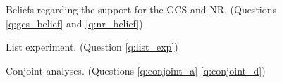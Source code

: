 \begin{figure}[h!]
    \caption{Beliefs regarding the support for the GCS and NR. (Questions \ref{q:gcs_belief} and \ref{q:nr_belief})}\label{fig:belief}
\end{figure}

\begin{figure}[h!]
    \caption{List experiment. (Question \ref{q:list_exp})}\label{fig:list_exp}
\end{figure}

\begin{figure}[h!]
    \caption{Conjoint analyses. (Questions \ref{q:conjoint_a}-\ref{q:conjoint_d})}\label{fig:conjoint}
\end{figure}


